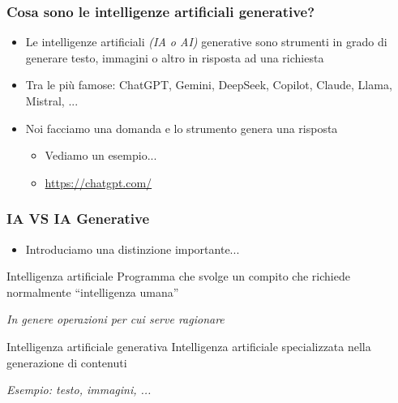 
\begin{contentframe}
    \frametitle{Cosa sono le intelligenze artificiali generative?}

    \begin{itemize}
        \item Le intelligenze artificiali \textit{(IA o AI)} generative sono strumenti in grado di generare testo, immagini o altro in risposta ad una richiesta

        \bigskip
        \item Tra le più famose: ChatGPT, Gemini, DeepSeek, Copilot, Claude, Llama, Mistral, ...

        \bigskip
        \item Noi facciamo una domanda e lo strumento genera una risposta
        \begin{itemize}
            \item Vediamo un esempio...
            \item \url{https://chatgpt.com/}
        \end{itemize}
    \end{itemize}
\end{contentframe}


\begin{contentframe}
    \frametitle{IA VS IA Generative}

    \begin{itemize}
        \item Introduciamo una distinzione importante...
    \end{itemize}

    \bigskip
    \begin{block}{Intelligenza artificiale}
        Programma che svolge un compito che richiede normalmente ``intelligenza umana''

        \small\textit{In genere operazioni per cui serve ragionare}
    \end{block}

    \begin{block}{Intelligenza artificiale generativa}
        Intelligenza artificiale specializzata nella generazione di contenuti
        
        \small\textit{Esempio: testo, immagini, ...}
    \end{block}
\end{contentframe}



